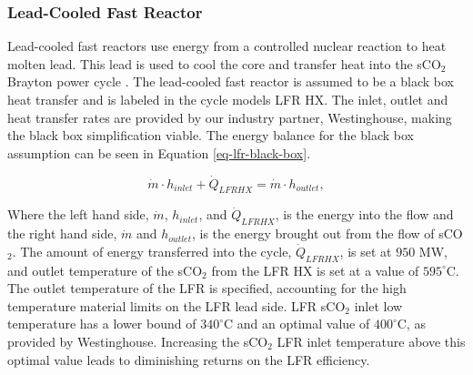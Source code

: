 \begin{paracol}{2}
\subsubsection{Lead-Cooled Fast Reactor}
Lead-cooled fast reactors use energy from a controlled nuclear reaction to heat molten lead. This lead is used to cool the core and transfer heat into the sCO$_2$ Brayton power cycle \cite{smith_2016_lfr_background,alemberti_2013_lfr_overview}. The lead-cooled fast reactor is assumed to be a black box heat transfer and is labeled in the cycle models LFR HX. The inlet, outlet and heat transfer rates are provided by our industry partner, Westinghouse, making the black box simplification viable. The energy balance for the black box assumption can be seen in Equation \ref{eq-lfr-black-box}.

\begin{equation}
    \label{eq-lfr-black-box}
    \dot{m} \cdot h_{inlet} + \dot{Q}_{LFRHX} = \dot{m} \cdot h_{outlet},
\end{equation}


Where the left hand side, $\dot{m}$, $h_{inlet}$, and $\dot{Q}_{LFRHX}$, is the energy into the flow and the right hand side, $\dot{m}$ and $h_{outlet}$, is the energy brought out from the flow of sCO$_2$. The amount of energy transferred into the cycle, $\dot{Q}_{LFRHX}$, is set at $950$ MW, and outlet temperature of the sCO$_2$ from the LFR HX is set at a value of $595^{\circ}$C. 
The outlet temperature of the LFR is specified, accounting for the high temperature material limits on the LFR lead side. LFR sCO$_2$ inlet low temperature has a lower bound of $340^{\circ}$C and an optimal value of $400^{\circ}$C, as provided by Westinghouse.
Increasing the sCO$_2$ LFR inlet temperature above this optimal value leads to diminishing returns on the LFR efficiency.



\end{paracol}
